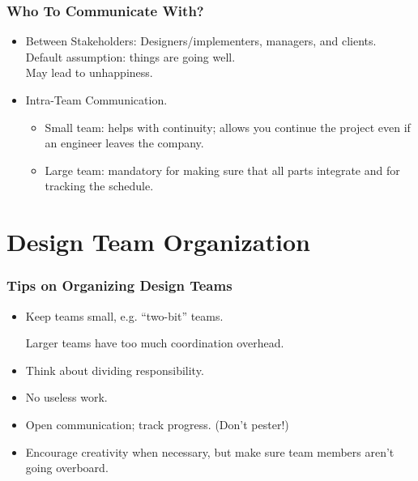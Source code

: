 \begin{frame}

\frametitle{Who To Communicate With?}

\begin{changemargin}{2em}
\begin{itemize}
\item Between Stakeholders: Designers/implementers, managers, and clients.\\[1em]

Default assumption: things are going well. \\ May lead to unhappiness.\\[1em]

\item Intra-Team Communication. 
\begin{itemize}
\item Small team:
helps with continuity; allows you continue the project even if an
engineer leaves the company. 

\item Large team: mandatory for making sure that all parts
integrate and for tracking the schedule.
\end{itemize}
\end{itemize}
\end{changemargin}

\end{frame}

\section{Design Team Organization}

\begin{frame}

\begin{changemargin}{2em}
\frametitle{Tips on Organizing Design Teams}

\begin{itemize}
\item Keep teams small, e.g. ``two-bit'' teams.

Larger teams have too much coordination overhead.
\item Think about dividing responsibility. 
\item No useless work.
\item Open communication; track progress. (Don't pester!)
\item Encourage creativity when necessary, but make sure team members
  aren't going overboard.
\end{itemize}
\end{changemargin}
\end{frame}

